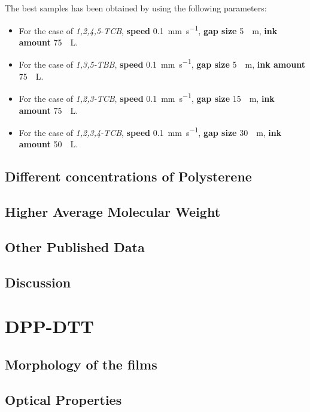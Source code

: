 \documentclass  [
  paper    = a4,
  BCOR     = 10mm,
  twoside,
  fontsize = 12pt,
  fleqn,
  toc      = bibnumbered,
  toc      = listofnumbered,
  numbers  = noendperiod,
  headings = normal,
  listof   = leveldown,
  version  = 3.03
]                                       {scrreprt}
\begin{document}
The best samples has been obtained by using the following parameters: 
	\begin{itemize}		
		\item  For the case of \emph{1,2,4,5-TCB}, \textbf{speed} \SI[per-mode=symbol]{0.1}{\milli\meter\per\second}, \textbf{gap size} \SI{5}{\mu \meter}, \textbf{ink amount} \SI{75}{\mu \liter}.
		\item  For the case of \emph{1,3,5-TBB}, \textbf{speed} \SI[per-mode=symbol]{0.1}{\milli\meter\per\second}, \textbf{gap size} \SI{5}{\mu \meter}, \textbf{ink amount} \SI{75}{\mu \liter}.
		\item  For the case of \emph{1,2,3-TCB}, \textbf{speed} \SI[per-mode=symbol]{0.1}{\milli\meter\per\second}, \textbf{gap size} \SI{15}{\mu \meter}, \textbf{ink amount} \SI{75}{\mu \liter}.
		\item  For the case of \emph{1,2,3,4-TCB}, \textbf{speed} \SI[per-mode=symbol]{0.1}{\milli\meter\per\second}, \textbf{gap size} \SI{30}{\mu \meter}, \textbf{ink amount} \SI{50}{\mu \liter}.
	\end{itemize}		
		
		
		\subsection{Different concentrations of Polysterene}\label{sec:concentration}
		
		\subsection{Higher Average Molecular Weight}\label{sec:mw}
		
		\subsection{Other Published Data}
		\subsection{Discussion}
	
	
	
	
	
	
	\section{DPP-DTT}
		\subsection{Morphology of the films}
		\subsection{Optical Properties}
\end{document}
